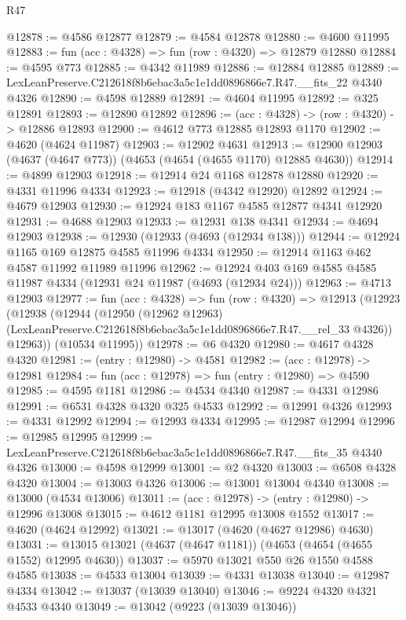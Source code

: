 \begin{lexlean}{R47}
\begin{coremodule}
@12878 := @4586 @12877
@12879 := @4584 @12878
@12880 := @4600 @11995
@12883 := fun (acc : @4328) => fun (row : @4320) => @12879 @12880
@12884 := @4595 @773
@12885 := @4342 @11989
@12886 := @12884 @12885
@12889 := LexLeanPreserve.C212618f8b6ebac3a5c1e1dd0896866e7.R47.__fits_22 @4340 @4326
@12890 := @4598 @12889
@12891 := @4604 @11995
@12892 := @325 @12891
@12893 := @12890 @12892
@12896 := (acc : @4328) -> (row : @4320) -> @12886 @12893
@12900 := @4612 @773 @12885 @12893 @1170
@12902 := @4620 (@4624 @11987)
@12903 := @12902 @4631
@12913 := @12900 @12903 (@4637 (@4647 @773)) (@4653 (@4654 (@4655 @1170) @12885 @4630))
@12914 := @4899 @12903
@12918 := @12914 @24 @1168 @12878 @12880
@12920 := @4331 @11996 @4334
@12923 := @12918 (@4342 @12920) @12892
@12924 := @4679 @12903
@12930 := @12924 @183 @1167 @4585 @12877 @4341 @12920
@12931 := @4688 @12903
@12933 := @12931 @138 @4341
@12934 := @4694 @12903
@12938 := @12930 (@12933 (@4693 (@12934 @138)))
@12944 := @12924 @1165 @169 @12875 @4585 @11996 @4334
@12950 := @12914 @1163 @462 @4587 @11992 @11989 @11996
@12962 := @12924 @403 @169 @4585 @4585 @11987 @4334 (@12931 @24 @11987 (@4693 (@12934 @24)))
@12963 := @4713 @12903
@12977 := fun (acc : @4328) =>
  fun (row : @4320) =>
  @12913
    (@12923
      (@12938
        (@12944
          (@12950
            (@12962 @12963)
            (LexLeanPreserve.C212618f8b6ebac3a5c1e1dd0896866e7.R47.__rel_33 @4326))
          @12963))
      (@10534 @11995))
@12978 := @6 @4320
@12980 := @4617 @4328 @4320
@12981 := (entry : @12980) -> @4581
@12982 := (acc : @12978) -> @12981
@12984 := fun (acc : @12978) => fun (entry : @12980) => @4590
@12985 := @4595 @1181
@12986 := @4534 @4340
@12987 := @4331 @12986
@12991 := @6531 @4328 @4320 @325 @4533
@12992 := @12991 @4326
@12993 := @4331 @12992
@12994 := @12993 @4334
@12995 := @12987 @12994
@12996 := @12985 @12995
@12999 := LexLeanPreserve.C212618f8b6ebac3a5c1e1dd0896866e7.R47.__fits_35 @4340 @4326
@13000 := @4598 @12999
@13001 := @2 @4320
@13003 := @6508 @4328 @4320
@13004 := @13003 @4326
@13006 := @13001 @13004 @4340
@13008 := @13000 (@4534 @13006)
@13011 := (acc : @12978) -> (entry : @12980) -> @12996 @13008
@13015 := @4612 @1181 @12995 @13008 @1552
@13017 := @4620 (@4624 @12992)
@13021 := @13017 (@4620 (@4627 @12986) @4630)
@13031 := @13015 @13021 (@4637 (@4647 @1181)) (@4653 (@4654 (@4655 @1552) @12995 @4630))
@13037 := @5970 @13021 @550 @26 @1550 @4588 @4585
@13038 := @4533 @13004
@13039 := @4331 @13038
@13040 := @12987 @4334
@13042 := @13037 (@13039 @13040)
@13046 := @9224 @4320 @4321 @4533 @4340
@13049 := @13042 (@9223 (@13039 @13046))

\end{coremodule}
\end{lexlean}
